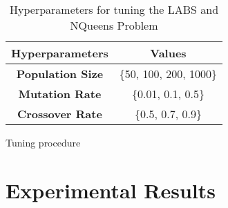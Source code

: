\documentclass{article}
\begin{document}
\begin{table}[h!]
    \centering
    \begin{tabular}{c|c}
        \textbf{Hyperparameters} & \textbf{Values}  \\ \hline
        \textbf{Population Size} & \{50, 100, 200, 1000\}  \\ \hline
        \textbf{Mutation Rate}   & \{0.01, 0.1, 0.5\} \\ 
        \textbf{Crossover Rate}  & \{0.5, 0.7, 0.9\} \\
    \end{tabular}
    \caption{Hyperparameters for tuning the LABS and NQueens Problem}
    \label{tab:my_label}
\end{table}


\begin{algorithm}[!ht]
\SetAlgoLined
{}

\BlankLine

\caption{Tuning procedure}\label{al:tuning}
\end{algorithm}

\section{Experimental Results}\label{sec:experi}



\end{document}
